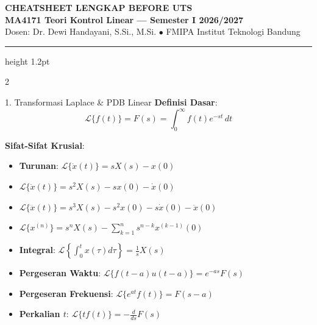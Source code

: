 \documentclass[10pt,a4paper]{article}
\begin{document}
\begin{center}
    {\LARGE\bfseries\sffamily\color{primary} CHEATSHEET LENGKAP BEFORE UTS}\\[3pt]
    {\large\bfseries\sffamily\color{secondary} MA4171 Teori Kontrol Linear --- Semester I 2026/2027}\\[2pt]
    {\small Dosen: Dr. Dewi Handayani, S.Si., M.Si. \quad $\bullet$ \quad FMIPA Institut Teknologi Bandung}
\end{center}
\vspace{-6pt}
\hrule height 1.2pt
\vspace{6pt}

\begin{multicols*}{2}

\begin{rumusbox}{1. Transformasi Laplace \& PDB Linear}
\textbf{Definisi Dasar}:
$$\mathcal{L}\{f(t)\} = F(s) = \int_0^\infty f(t) e^{-st} \, dt$$

\textbf{Sifat-Sifat Krusial}:
\begin{itemize}\setlength\itemsep{1pt}
    \item \textbf{Turunan}: $\mathcal{L}\{\dot{x}(t)\} = s X(s) - x(0)$
    \item $\mathcal{L}\{\ddot{x}(t)\} = s^2 X(s) - s x(0) - \dot{x}(0)$
    \item $\mathcal{L}\{\dddot{x}(t)\} = s^3 X(s) - s^2 x(0) - s \dot{x}(0) - \ddot{x}(0)$
    \item $\mathcal{L}\{x^{(n)}\} = s^n X(s) - \sum_{k=1}^n s^{n-k} x^{(k-1)}(0)$
    \item \textbf{Integral}: $\mathcal{L}\left\{\int_0^t x(\tau) d\tau\right\} = \frac{1}{s} X(s)$
    \item \textbf{Pergeseran Waktu}: $\mathcal{L}\{f(t-a)u(t-a)\} = e^{-as} F(s)$
    \item \textbf{Pergeseran Frekuensi}: $\mathcal{L}\{e^{at} f(t)\} = F(s-a)$
    \item \textbf{Perkalian $t$}: $\mathcal{L}\{t f(t)\} = -\frac{d}{ds} F(s)$
\end{itemize}


\end{rumusbox}
\end{multicols*}
\end{document}

